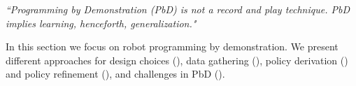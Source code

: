 \begin{center}
	\textit{``Programming by Demonstration (PbD) is not a record and play technique. PbD implies learning, henceforth, generalization." }\\ \cite{billard2016learning}
\end{center}


In this section we focus on robot programming by demonstration.
We present different approaches for design choices (), data gathering (), policy derivation () and policy refinement (), and challenges in PbD ().







